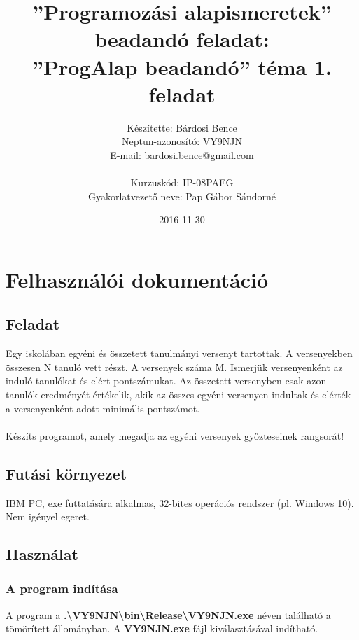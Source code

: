 \documentclass[a4paper]{article}
\title{”Programozási alapismeretek”\\ beadandó feladat:\\ ”ProgAlap beadandó” téma 1. feladat}
\date{2016-11-30}
\author{Készítette: Bárdosi Bence\\ Neptun-azonosító: VY9NJN\\ E-mail: bardosi.bence@gmail.com\\\\ Kurzuskód: IP-08PAEG\\ Gyakorlatvezető neve: Pap Gábor Sándorné}
\begin{document}
  \maketitle
  \newpage

  \tableofcontents
  \newpage

  \section{Felhasználói dokumentáció}
    \subsection{Feladat}
      Egy iskolában egyéni és összetett tanulmányi versenyt tartottak.
      A versenyekben összesen N tanuló vett részt. A versenyek száma M.
      Ismerjük versenyenként az induló tanulókat és elért pontszámukat.
      Az összetett versenyben csak azon tanulók eredményét értékelik,
      akik az összes egyéni versenyen indultak és elérték a versenyenként adott minimális pontszámot.
      \\
      \\ Készíts programot, amely megadja az egyéni versenyek győzteseinek rangsorát!
    \subsection{Futási környezet}
      IBM PC, exe futtatására alkalmas, 32-bites operációs rendszer (pl. Windows 10). Nem igényel egeret.
    \subsection{Használat}
      \subsubsection{A program indítása}
        A program a \textbf{.\textbackslash VY9NJN\textbackslash bin\textbackslash Release\textbackslash VY9NJN.exe} néven található a tömörített állományban. A \textbf{VY9NJN.exe} fájl kiválasztásával indítható.
\end{document}
